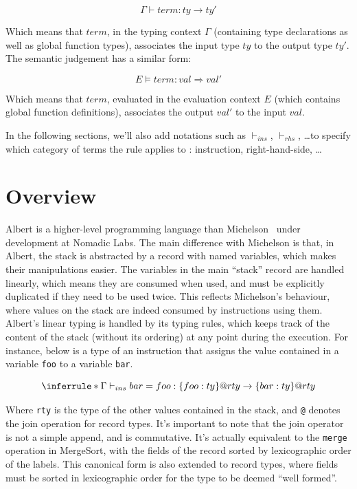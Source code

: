 \documentclass{report}
\begin{document}
$$\Gamma \vdash term : ty \rightarrow ty'$$

Which means that $term$, in the typing context $\Gamma$ (containing type declarations as well as global function types), associates the input type $ty$ to the output type $ty'$. The semantic judgement has a similar form:

$$E \models term : val \Rightarrow val'$$

Which means that $term$, evaluated in the evaluation context $E$ (which contains global function definitions), associates the output $val'$ to the input $val$.

In the following sections, we'll also add notations such as $\vdash_{ins}$, $\vdash_{rhs}$, \ldots to specify which category of terms the rule applies to : instruction, right-hand-side, \ldots

\section{Overview}

Albert is a higher-level programming language than Michelson~\cite{albertProposal} under development at Nomadic Labs. The main difference with Michelson is that, in Albert, the stack is abstracted by a record with named variables, which makes their manipulations easier. The variables in the main ``stack'' record are handled linearly, which means they are consumed when used, and must be explicitly duplicated if they need to be used twice. This reflects Michelson's behaviour, where values on the stack are indeed consumed by instructions using them.\\

Albert's linear typing is handled by its typing rules, which keeps track of the content of the stack (without its ordering) at any point during the execution. For instance, below is a type of an instruction that assigns the value contained in a variable \texttt{foo} to a variable \texttt{bar}.

$$
\inferrule*
    { }
    { \Gamma \vdash_{ins} bar = foo : \{ foo : ty \} @ rty \rightarrow \{ bar : ty \} @ rty }
$$

    Where \texttt{rty} is the type of the other values contained in the stack, and \texttt{@} denotes the join operation for record types. It's important to note that the join operator is not a simple append, and is commutative. It's actually equivalent to the \texttt{merge} operation in MergeSort, with the fields of the record sorted by lexicographic order of the labels. This canonical form is also extended to record types, where fields must be sorted in lexicographic order for the type to be deemed ``well formed''.
\end{document}
